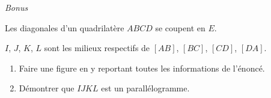 \begin{minipage}{0.45\textwidth}
\vspace*{1em}

\begin{center}
\end{center}

\vspace*{2em}

\hrulefill
\exercice\hfill \emph{Bonus}

Les diagonales d’un quadrilatère $ABCD$ se coupent en $E$.

$I$, $J$, $K$, $L$ sont les milieux respectifs de $[AB]$, $[BC]$, $[CD]$, $[DA]$.

\begin{enumerate}
	\item Faire une figure en y reportant toutes les informations de l’énoncé.
	\item Démontrer que $IJKL$ est un parallélogramme.
\end{enumerate}


\end{minipage}